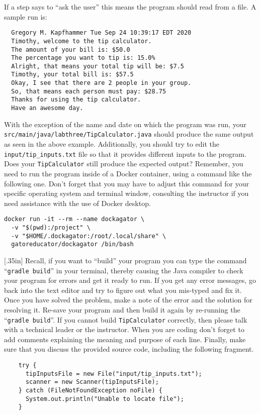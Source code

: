 \documentclass[11pt]{article}
\newcommand{\mainprogram}{\lstinline{TipCalculator}}
\newcommand{\mainprogramsource}{\lstinline{src/main/java/labthree/TipCalculator.java}}
\newcommand{\mainprograminput}{\lstinline{input/tip_inputs.txt}}
\newcommand{\gradlebuild}{\command{gradle build}}
\newcommand{\command}[1]{``\lstinline{#1}''}
\newcommand{\step}[1]{``{#1}''}
\newcommand{\discuss}[1]{\null\hfill\LARGE{\faCommentO{}}\newline\scriptsize{\em{#1}}}
\begin{document}
\noindent If a step says to ``ask the user'' this means the program should read
from a file. A sample run is:

\begin{verbatim}
  Gregory M. Kapfhammer Tue Sep 24 10:39:17 EDT 2020
  Timothy, welcome to the tip calculator.
  The amount of your bill is: $50.0
  The percentage you want to tip is: 15.0%
  Alright, that means your total tip will be: $7.5
  Timothy, your total bill is: $57.5
  Okay, I see that there are 2 people in your group.
  So, that means each person must pay: $28.75
  Thanks for using the tip calculator.
  Have an awesome day.
\end{verbatim}

With the exception of the name and date on which the program was run, your
\mainprogramsource{} should produce the same output as seen in the above
example. Additionally, you should try to edit the \mainprograminput{} file so
that it provides different inputs to the program. Does your \mainprogram{} still
produce the expected output? Remember, you need to run the program inside of a
Docker container, using a command like the following one. Don't forget that you
may have to adjust this command for your specific operating system and terminal
window, consulting the instructor if you need assistance with the use of Docker
desktop.

\begin{verbatim}
docker run -it --rm --name dockagator \
  -v "$(pwd):/project" \
  -v "$HOME/.dockagator:/root/.local/share" \
  gatoreducator/dockagator /bin/bash
\end{verbatim}

\marginnote{\discuss{Discuss input code}}[.35in] Recall, if you want to
\step{build} your program you can type the command \gradlebuild{} in your
terminal, thereby causing the Java compiler to check your program for errors
and get it ready to run. If you get any error messages, go back into the text
editor and try to figure out what you mis-typed and fix it. Once you have
solved the problem, make a note of the error and the solution for resolving it.
Re-save your program and then build it again by re-running the \gradlebuild{}.
If you cannot build \mainprogram{} correctly, then please talk with a technical
leader or the instructor. When you are coding don't forget to add comments
explaining the meaning and purpose of each line. Finally, make sure that you
discuss the provided source code, including the following fragment.

\begin{verbatim}
    try {
      tipInputsFile = new File("input/tip_inputs.txt");
      scanner = new Scanner(tipInputsFile);
    } catch (FileNotFoundException noFile) {
      System.out.println("Unable to locate file");
    }
\end{verbatim}
\end{document}
